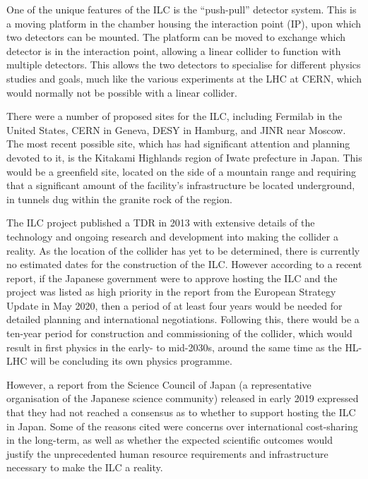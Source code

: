 One of the unique features of the \acrshort{ILC} is the ``push-pull'' detector system. This is a moving platform in the chamber housing the interaction point (\acrshort{IP}), upon which two detectors can be mounted. The platform can be moved to exchange which detector is in the interaction point, allowing a linear collider to function with multiple detectors. This allows the two detectors to specialise for different physics studies and goals, much like the various experiments at the \acrshort{LHC} at \acrshort{CERN}, which would normally not be possible with a linear collider.

There were a number of proposed sites for the \acrshort{ILC}, including Fermilab in the United States, \acrshort{CERN} in Geneva, \acrshort{DESY} in Hamburg, and \acrshort{JINR} near Moscow. The most recent possible site, which has had significant attention and planning devoted to it, is the Kitakami Highlands region of Iwate prefecture in Japan. This would be a greenfield site, located on the side of a mountain range and requiring that a significant amount of the facility's infrastructure be located underground, in tunnels dug within the granite rock of the region. 

The \acrshort{ILC} project published a \acrfull{TDR} in 2013 \cite{ilc-tdr-summary} with extensive details of the technology and ongoing research and development into making the collider a reality. As the location of the collider has yet to be determined, there is currently no estimated dates for the construction of the \acrshort{ILC}. However according to a recent report\cite{ilc-timeline-2019}, if the Japanese government were to approve hosting the \acrshort{ILC} and the project was listed as high priority in the report from the European Strategy Update in May 2020, then a period of at least four years would be needed for detailed planning and international negotiations. Following this, there would be a ten-year period for construction and commissioning of the collider, which would result in first physics in the early- to mid-2030s, around the same time as the \acrshort{HL-LHC} will be concluding its own physics programme.

However, a report from the Science Council of Japan (a representative organisation of the Japanese science community) released in early 2019 expressed that they had not reached a consensus as to whether to support hosting the \acrshort{ILC} in Japan. Some  of the reasons cited were concerns over international cost-sharing in the long-term, as well as whether the expected scientific outcomes would justify the unprecedented human resource requirements and infrastructure necessary to make the \acrshort{ILC} a reality\cite{linearcolliders-scj-report}.

